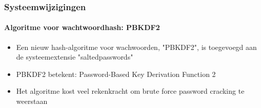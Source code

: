 \begin{frame}[fragile]
	\frametitle{Systeemwijzigingen}
	\framesubtitle{Algoritme voor wachtwoordhash: PBKDF2}

	\begin{itemize}

		\item Een nieuw hash-algoritme voor wachwoorden, "PBKDF2", is toegevoegd aan de systeemextensie "saltedpasswords"

		\item PBKDF2 betekent: Password-Based Key Derivation Function 2

		\item Het algoritme kost veel rekenkracht om brute force password cracking te weerstaan

	\end{itemize}

\end{frame}

